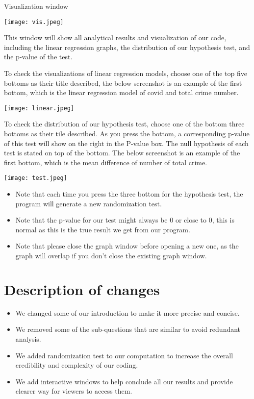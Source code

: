 \documentclass[fontsize=11pt]{article}
\begin{document}
\newpage
Visualization window

\texttt{[image: vis.jpeg]}

This window will show all analytical results and visualization of our code, including the linear regression graphs, the distribution of our hypothesis test, and the p-value of the test.

To check the visualizations of linear regression models, choose one of the top five bottoms as their title described, the below screenshot is an example of the first bottom, which is the linear regression model of covid and total crime number.

\texttt{[image: linear.jpeg]}

To check the distribution of our hypothesis test, choose one of the bottom three bottoms as their tile described. As you press the bottom, a corresponding p-value of this test will show on the right in the P-value box. The null hypothesis of each test is stated on top of the bottom. The below screenshot is an example of the first bottom, which is the mean difference of number of total crime.

\texttt{[image: test.jpeg]}

\begin{itemize}
    \item Note that each time you press the three bottom for the hypothesis test, the program will generate a new randomization test.
    \item Note that the p-value for our test might always be 0 or close to 0, this is normal as this is the true result we get from our program.
    \item Note that please close the graph window before opening a new one, as the graph will overlap if you don't close the existing graph window.
\end{itemize}


\section*{Description of changes}
\begin{itemize}
\item We changed some of our introduction to make it more precise and concise.
\item We removed some of the sub-questions that are similar to avoid redundant analysis.
\item We added randomization test to our computation to increase the overall credibility and complexity of our coding.
\item We add interactive windows to help conclude all our results and provide clearer way for viewers to access them.
\end{itemize}
\end{document}
